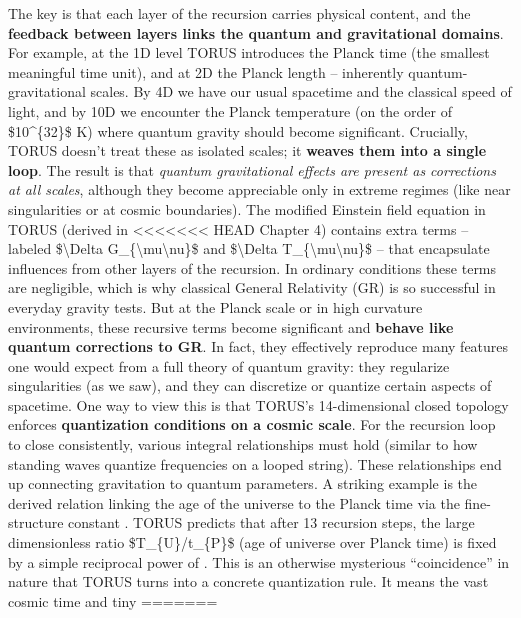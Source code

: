 \documentclass[]{article}
\begin{document}
The key is that each layer of the recursion carries physical content,
and the \textbf{feedback between layers links the quantum and
gravitational domains}. For example, at the 1D level TORUS introduces
the Planck time (the smallest meaningful time unit), and at 2D the
Planck length -- inherently quantum-gravitational scales. By 4D we have
our usual spacetime and the classical speed of light, and by 10D we
encounter the Planck temperature (on the order of \$10\^{}\{32\}\$ K)
where quantum gravity should become significant. Crucially, TORUS
doesn't treat these as isolated scales; it \textbf{weaves them into a
single loop}. The result is that \emph{quantum gravitational effects are
present as corrections at all scales}, although they become appreciable
only in extreme regimes (like near singularities or at cosmic
boundaries). The modified Einstein field equation in TORUS (derived in
<<<<<<< HEAD
Chapter 4) contains extra terms -- labeled \$\textbackslash Delta
G\_\{\textbackslash mu\textbackslash nu\}\$ and \$\textbackslash Delta
T\_\{\textbackslash mu\textbackslash nu\}\$ -- that encapsulate
influences from other layers of the recursion\hspace{0pt}. In ordinary
conditions these terms are negligible, which is why classical General
Relativity (GR) is so successful in everyday gravity tests. But at the
Planck scale or in high curvature environments, these recursive terms
become significant and \textbf{behave like quantum corrections to GR}.
In fact, they effectively reproduce many features one would expect from
a full theory of quantum gravity: they regularize singularities (as we
saw), and they can discretize or quantize certain aspects of spacetime.
One way to view this is that TORUS's 14-dimensional closed topology
enforces \textbf{quantization conditions on a cosmic scale}. For the
recursion loop to close consistently, various integral relationships
must hold (similar to how standing waves quantize frequencies on a
looped string). These relationships end up connecting gravitation to
quantum parameters. A striking example is the derived relation linking
the age of the universe to the Planck time via the fine-structure
constant \alpha. TORUS predicts that after 13 recursion steps, the large
dimensionless ratio \$T\_\{U\}/t\_\{P\}\$ (age of universe over Planck
time) is fixed by a simple reciprocal power of \alpha\hspace{0pt}. This is an
otherwise mysterious ``coincidence'' in nature that TORUS turns into a
concrete quantization rule. It means the vast cosmic time and tiny
=======
\end{document}
